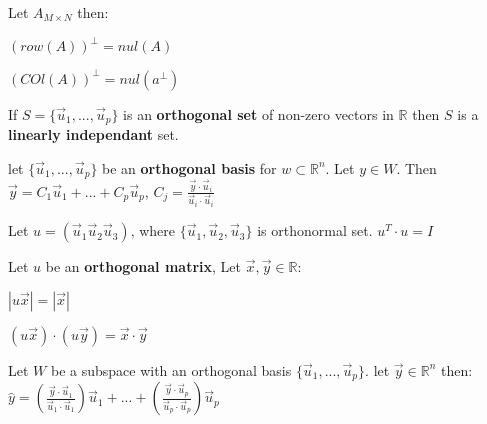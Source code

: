 \documentclass[5pt]{article}
\begin{document}
\begin{multicols}{2}
\begin{theorem}
  Let $A_{M\times N}$ then:
  \begin{itemize*}
    \item $(row(A))^\perp=nul(A)$
    \item $(COl(A))^\perp=nul(a^\perp)$
  \end{itemize*}
\end{theorem}

\begin{theorem}
  If $S=\{\vec{u}_1,...,\vec{u}_p\}$ is an \textbf{orthogonal set} of non-zero vectors in $\mathbb{R}$ then $S$ is a \textbf{linearly independant} set. 
\end{theorem}

\begin{theorem}
  let $\{\vec{u}_1,...,\vec{u}_p\}$ be an \textbf{orthogonal basis} for $w\subset \mathbb{R}^n$. 
  Let $y\in W$. Then $\vec{y}=C_1\vec{u}_1 + ... + C_p\vec{u}_p$, $C_j=\frac{\vec{y}\cdot\vec{u}_i}{\vec{u}_i\cdot\vec{u}_i}$
\end{theorem}

\begin{theorem}
  Let $u=(\vec{u}_1 \vec{u}_2 \vec{u}_3)$, where $\{\vec{u}_1, \vec{u}_2, \vec{u}_3\}$ is orthonormal set.
  $u^T\cdot u= I$
\end{theorem}

\begin{theorem}
  Let $u$ be an \textbf{orthogonal matrix}, Let $\vec{x},\vec{y}\in\mathbb{R}$:
  \begin{itemize*}
    \item $|u\vec{x}|=|\vec{x}|\:$
    \item $(u\vec{x})\cdot(u\vec{y})=\vec{x}\cdot\vec{y}$
  \end{itemize*}
\end{theorem}

\begin{theorem}
  Let $W$ be a subspace with an orthogonal basis $\{\vec{u}_1,...,\vec{u}_p\}$. let $\vec{y}\in\mathbb{R}^n$ then: 
  $\hat{y}=\left(\frac{\vec{y}\cdot\vec{u}_1}{\vec{u}_1\cdot\vec{u}_1}\right)\vec{u}_1 + ... + \left(\frac{\vec{y}\cdot\vec{u}_p}{\vec{u}_p\cdot\vec{u}_p}\right)\vec{u}_p$
\end{theorem}


\end{multicols}
\end{document}
